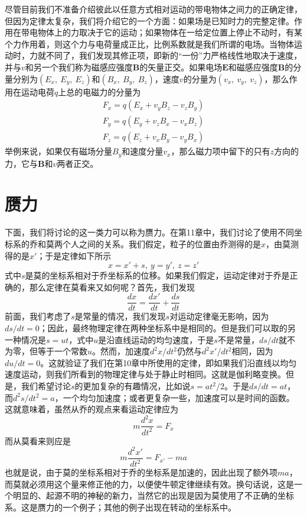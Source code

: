 尽管目前我们不准备介绍彼此以任意方式相对运动的带电物体之间力的正确定律，但因为定律太复杂，我们将介绍它的一个方面：如果场是已知时力的完整定律。作用在带电物体上的力取决于它的运动；如果物体在一给定位置上停止不动时，有某个力作用着，则这个力与电荷量成正比，比例系数就是我们所谓的电场。当物体运动时，力就不同了，我们发现其修正项，即新的“一份”力严格线性地取决于速度，并与$v$和另一个我们称为磁感应强度$\boldsymbol{B}$的矢量正交。如果电场$\boldsymbol{E}$和磁感应强度$\boldsymbol{B}$的分量分别为$(E_x,~E_y,~E_z)$和$(B_x,~B_y,~B_z)$，速度$v$的分量为$(v_x,~v_y,~v_z)$，那么作用在运动电荷$q$上总的电磁力的分量为
\begin{equation}
    \label{Eq:I:12:11}
    \begin{split}
        F_x=q(E_x+v_yB_z-v_zB_y) \\
        F_y=q(E_y+v_zB_x-v_xB_z) \\
        F_z=q(E_z+v_xB_y-v_yB_x)
    \end{split}
\end{equation}
举例来说，如果仅有磁场分量$B_y$和速度分量$v_x$，那么磁力项中留下的只有$z$方向的力，它与$\boldsymbol{B}$和$v$两者正交。

\section{赝力}

下面，我们将讨论的这一类力可以称为赝力。在第11章中，我们讨论了使用不同坐标系的乔和莫两个人之间的关系。我们假定，粒子的位置由乔测得的是$x$，由莫测得的是$x'$；于是定律如下所示
\begin{equation*}
    x=x'+s,~y=y',~z=z'
\end{equation*}
式中$s$是莫的坐标系相对于乔坐标系的位移。如果我们假定，运动定律对于乔是正确的，那么定律在莫看来又如何呢？首先，我们发现
\begin{equation*}
    \frac{dx}{dt}=\frac{dx'}{dt}+\frac{ds}{dt}
\end{equation*}
前面，我们考虑了$s$是常量的情况，我们发现$s$对运动定律毫无影响，因为$ds/dt=0$；因此，最终物理定律在两种坐标系中是相同的。但是我们可以取的另一种情况是$s=ut$，式中$u$是沿直线运动的均匀速度，于是$s$不是常量，$ds/dt$就不为零，但等于一个常数$u$。然而，加速度$d^2x/dt^2$仍然与$d^2x'/dt^2$相同，因为$du/dt=0$。这就验证了我们在第10章中所使用的定律，即如果我们沿直线以均匀速度运动，则我们所看到的物理定律与处于静止时相同。这就是伽利略变换。但是，我们希望讨论$s$的更加复杂的有趣情况，比如说$s=at^2/2$。于是$ds/dt=at$，而$d^2s/dt^2=a$，一个均匀加速度；或者更复杂一些，加速度可以是时间的函数。这就意味着，虽然从乔的观点来看运动定律应为
\begin{equation*}
    m\frac{d^2x}{dt^2}=F_x
\end{equation*}
而从莫看来则应是
\begin{equation*}
    m\frac{d^2x'}{dt^2}=F_{x'}-ma
\end{equation*}
也就是说，由于莫的坐标系相对于乔的坐标系是加速的，因此出现了额外项$ma$，而莫就必须用这个量来修正他的力，以便使牛顿定律继续有效。换句话说，这是一个明显的、起源不明的神秘的新力，当然它的出现是因为莫使用了不正确的坐标系。这是赝力的一个例子；其他的例子出现在转动的坐标系中。

